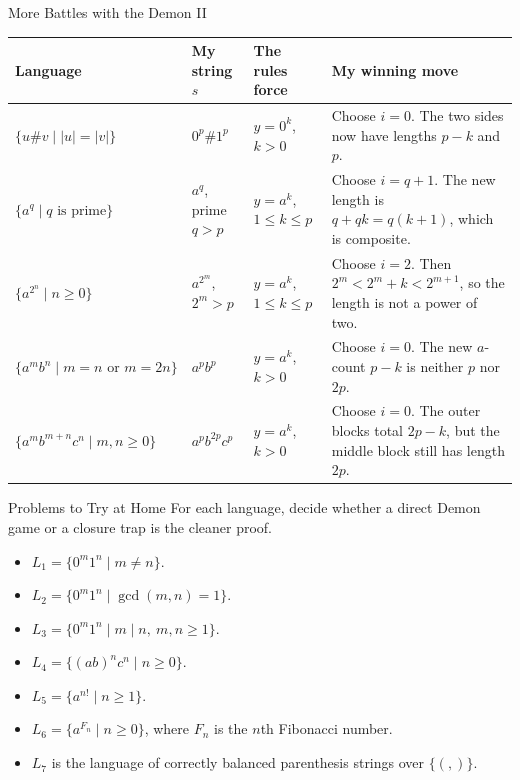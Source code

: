 \documentclass[10pt,aspectratio=169]{beamer}
\begin{document}
\begin{frame}{More Battles with the Demon II}
\scriptsize
\renewcommand{\arraystretch}{1.34}
\setlength{\tabcolsep}{3pt}
\begin{center}
\begin{tabular}{p{3.0cm}p{2.5cm}p{2.2cm}p{5.3cm}}
\toprule
\textbf{Language} &
\textbf{My string $s$} &
\textbf{The rules force} &
\textbf{My winning move} \\
\midrule
$\{u\#v\mid |u|=|v|\}$ &
$0^p\#1^p$ &
$y=0^k$, $k>0$ &
Choose $i=0$. The two sides now have lengths $p-k$ and $p$. \\
\addlinespace
$\{a^q\mid q\text{ is prime}\}$ &
$a^q$, prime $q>p$ &
$y=a^k$, $1\leq k\leq p$ &
Choose $i=q+1$. The new length is $q+qk=q(k+1)$, which is composite. \\
\addlinespace
$\{a^{2^n}\mid n\geq 0\}$ &
$a^{2^m}$, $2^m>p$ &
$y=a^k$, $1\leq k\leq p$ &
Choose $i=2$. Then $2^m<2^m+k<2^{m+1}$, so the length is not a power of two. \\
\addlinespace
$\{a^mb^n\mid m=n\text{ or }m=2n\}$ &
$a^pb^p$ &
$y=a^k$, $k>0$ &
Choose $i=0$. The new $a$-count $p-k$ is neither $p$ nor $2p$. \\
\addlinespace
$\{a^mb^{m+n}c^n\mid m,n\geq 0\}$ &
$a^pb^{2p}c^p$ &
$y=a^k$, $k>0$ &
Choose $i=0$. The outer blocks total $2p-k$, but the middle block still has length $2p$. \\
\bottomrule
\end{tabular}
\end{center}
\end{frame}

\begin{frame}{Problems to Try at Home}
\small
For each language, decide whether a direct Demon game or a closure trap
is the cleaner proof.

\begin{itemize}
    \item $L_1=\{0^m1^n\mid m\neq n\}$.
    \item $L_2=\{0^m1^n\mid \gcd(m,n)=1\}$.
    \item $L_3=\{0^m1^n\mid m\mid n,\ m,n\geq 1\}$.
    \item $L_4=\{(ab)^nc^n\mid n\geq 0\}$.
    \item $L_5=\{a^{n!}\mid n\geq 1\}$.
    \item $L_6=\{a^{F_n}\mid n\geq 0\}$, where $F_n$ is the $n$th Fibonacci number.
    \item $L_7$ is the language of correctly balanced parenthesis strings over $\{(,)\}$.
\end{itemize}
\end{frame}
\end{document}
